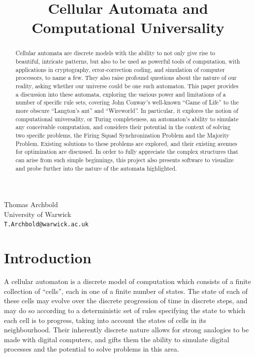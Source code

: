 \documentclass[11pt,a4paper]{article}
\title{Cellular Automata and Computational Universality}
\begin{document}
\maketitle

\begin{center}
    Thomas Archbold \\
    University of Warwick \\
    \texttt{T.Archbold@warwick.ac.uk}
\end{center}

\begin{abstract}
    Cellular automata are discrete models with the ability to not only give rise
    to beautiful, intricate patterns, but also to be used as powerful tools of
    computation, with applications in cryptography, error-correction coding, and
    simulation of computer processors, to name a few. They also raise profound
    questions about the nature of our reality, asking whether our universe could
    be one such automaton. This paper provides a discussion into these automata,
    exploring the various power and limitations of a number of specific rule
    sets, covering John Conway's well-known ``Game of Life'' to the more obscure
    ``Langton's ant'' and ``Wireworld''. In particular, it explores the notion
    of computational universality, or Turing completeness, an automaton's
    ability to simulate any conceivable computation, and considers their
    potential in the context of solving two specific problems, the Firing Squad
    Synchronization Problem and the Majority Problem. Existing solutions to
    these problems are explored, and their existing avenues for optimization are
    discussed. In order to fully appreciate the complex structures that can
    arise from such simple beginnings, this project also presents software to
    visualize and probe further into the nature of the automata highlighted.
\end{abstract}

\section{Introduction}
    A cellular automaton is a discrete model of computation which consists of a
    finite collection of ``cells'', each in one of a finite number of states.
    The state of each of these cells may evolve over the discrete progression of
    time in discrete steps, and may do so according to a deterministic set of
    rules specifying the state to which each cell is to progress, taking into
    account the states of cells in its neighbourhood. Their inherently discrete
    nature allows for strong analogies to be made with digital computers, and
    gifts them the ability to simulate digital processes and the potential to
    solve problems in this area. 
    
\end{document}
